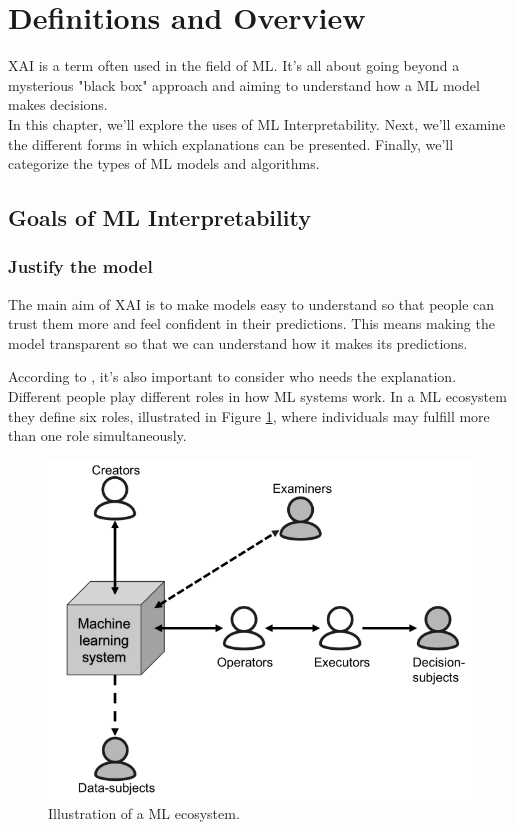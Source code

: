 
\newpage
\section{Definitions and Overview}\label{sec:2}

XAI is a term often used in the field of ML. It's all about going beyond a mysterious "black box" approach and aiming to understand how a ML model makes decisions.\\
In this chapter, we'll explore the uses of ML Interpretability. Next, we'll examine the different forms in which explanations can be presented. Finally, we'll categorize the types of ML models and algorithms.

\subsection{Goals of ML Interpretability}\label{sec:goals}

\subsubsection*{Justify the model} 
The main aim of XAI is to make models easy to understand so that people can trust them more and feel confident in their predictions. This means making the model transparent so that we can understand how it makes its predictions.

According to \cite{InterpretableToWhom}, it's also important to consider who needs the explanation. Different people play different roles in how ML systems work.
In a ML ecosystem they define six roles, illustrated in Figure \ref{fig:InterpretableToWhom}, where individuals may fulfill more than one role simultaneously.

\begin{figure}[H]
    \centering
    \includegraphics[width=0.6\linewidth]{pics/ill_ml_justify.png}
    \caption[Illustration of a ML ecosystem.]{Illustration of a ML ecosystem.\cite{InterpretableToWhom}}
    \label{fig:InterpretableToWhom}
\end{figure}

